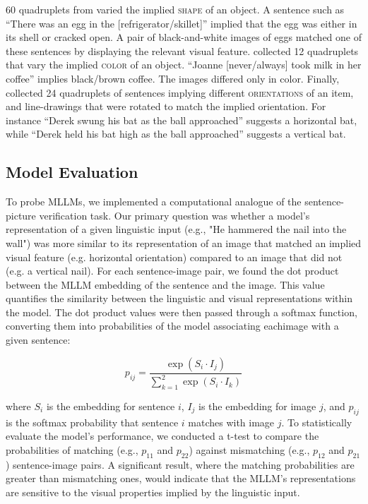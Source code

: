 \documentclass[10pt, a4paper]{article}
\begin{document}
60 quadruplets from \citet{pecher2009short} varied the implied \textsc{shape} of an object. A sentence such as ``There was an egg in the [refrigerator/skillet]'' implied that the egg was either in its shell or cracked open. A pair of black-and-white images of eggs matched one of these sentences by displaying the relevant visual feature.
\citet{connell2007representing} collected 12 quadruplets that vary the implied \textsc{color} of an object. ``Joanne [never/always] took milk in her coffee'' implies black/brown coffee. The images differed only in color.
Finally, \citet{stanfield2001effect} collected 24 quadruplets of sentences implying different \textsc{orientations} of an item, and line-drawings that were rotated to match the implied orientation. For instance ``Derek swung his bat as the ball approached'' suggests a horizontal bat, while ``Derek held his bat high as the ball approached'' suggests a vertical bat.


\subsection{Model Evaluation}

To probe MLLMs, we implemented a computational analogue of the sentence-picture verification task. Our primary question was whether a model's representation of a given linguistic input (e.g., "He hammered the nail into the wall") was more similar to its representation of an image that matched an implied visual feature (e.g. horizontal orientation) compared to an image that did not (e.g. a vertical nail).
For each sentence-image pair, we found the dot product between the MLLM embedding of the sentence and the image. This value quantifies the similarity between the linguistic and visual representations within the model. The dot product values were then passed through a softmax function, converting them into probabilities of the model associating eachimage with a given sentence:

\[ p_{ij} = \frac{\exp(S_i \cdot I_j)}{\sum_{k=1}^{2} \exp(S_i \cdot I_k)} \]

where \( S_i \) is the embedding for sentence \( i \), \( I_j \) is the embedding for image \( j \), and \( p_{ij} \) is the softmax probability that sentence \( i \) matches with image \( j \).
To statistically evaluate the model's performance, we conducted a t-test to compare the probabilities of matching (e.g., \( p_{11} \) and \( p_{22} \)) against mismatching (e.g., \( p_{12} \) and \( p_{21} \)) sentence-image pairs. A significant result, where the matching probabilities are greater than mismatching ones, would indicate that the MLLM's representations are sensitive to the visual properties implied by the linguistic input.
\end{document}
